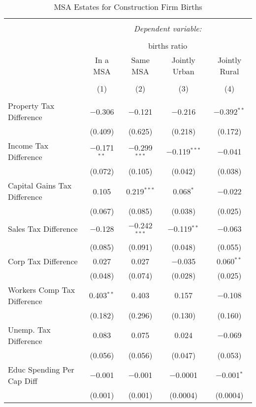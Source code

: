 
\begin{table}[!htbp] \centering 
  \caption{MSA Estates for  Construction Firm Births} 
  \label{23metro} 
\begin{tabular}{@{\extracolsep{5pt}}lcccc} 
\\[-1.8ex]\hline 
\hline \\[-1.8ex] 
 & \multicolumn{4}{c}{\textit{Dependent variable:}} \\ 
\cline{2-5} 
\\[-1.8ex] & \multicolumn{4}{c}{births ratio} \\ 
 & In a MSA & Same MSA & Jointly Urban & Jointly Rural \\ 
\\[-1.8ex] & (1) & (2) & (3) & (4)\\ 
\hline \\[-1.8ex] 
 Property Tax Difference & $-$0.306 & $-$0.121 & $-$0.216 & $-$0.392$^{**}$ \\ 
  & (0.409) & (0.625) & (0.218) & (0.172) \\ 
  Income Tax Difference & $-$0.171$^{**}$ & $-$0.299$^{***}$ & $-$0.119$^{***}$ & $-$0.041 \\ 
  & (0.072) & (0.105) & (0.042) & (0.038) \\ 
  Capital Gains Tax Difference & 0.105 & 0.219$^{***}$ & 0.068$^{*}$ & $-$0.022 \\ 
  & (0.067) & (0.085) & (0.038) & (0.025) \\ 
  Sales Tax Difference & $-$0.128 & $-$0.242$^{***}$ & $-$0.119$^{**}$ & $-$0.063 \\ 
  & (0.085) & (0.091) & (0.048) & (0.055) \\ 
  Corp Tax Difference & 0.027 & 0.027 & $-$0.035 & 0.060$^{**}$ \\ 
  & (0.048) & (0.074) & (0.028) & (0.025) \\ 
  Workers Comp Tax Difference & 0.403$^{**}$ & 0.403 & 0.157 & $-$0.108 \\ 
  & (0.182) & (0.296) & (0.130) & (0.160) \\ 
  Unemp. Tax Difference & 0.083 & 0.075 & 0.024 & $-$0.069 \\ 
  & (0.056) & (0.056) & (0.047) & (0.053) \\ 
  Educ Spending Per Cap Diff & $-$0.001 & $-$0.001 & $-$0.0001 & $-$0.001$^{*}$ \\ 
  & (0.001) & (0.001) & (0.0004) & (0.0004) \\ 

\end{tabular}
\end{table}
